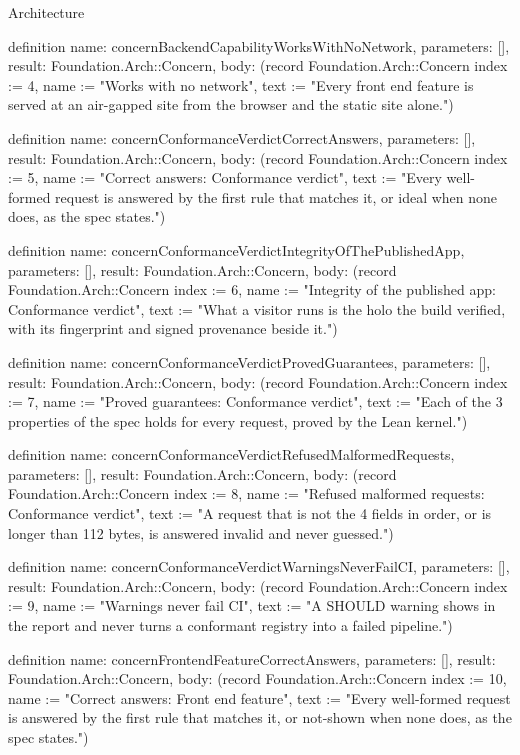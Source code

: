 \begin{lexlean}{Architecture}
\begin{semanticmodule}
definition{
  name: concernBackendCapabilityWorksWithNoNetwork,
  parameters: [],
  result: Foundation.Arch::Concern,
  body: (record Foundation.Arch::Concern {index := 4, name := "Works with no network", text := "Every front end feature is served at an air-gapped site from the browser and the static site alone."})
}

definition{
  name: concernConformanceVerdictCorrectAnswers,
  parameters: [],
  result: Foundation.Arch::Concern,
  body: (record Foundation.Arch::Concern {index := 5, name := "Correct answers: Conformance verdict", text := "Every well-formed request is answered by the first rule that matches it, or ideal when none does, as the spec states."})
}

definition{
  name: concernConformanceVerdictIntegrityOfThePublishedApp,
  parameters: [],
  result: Foundation.Arch::Concern,
  body: (record Foundation.Arch::Concern {index := 6, name := "Integrity of the published app: Conformance verdict", text := "What a visitor runs is the holo the build verified, with its fingerprint and signed provenance beside it."})
}

definition{
  name: concernConformanceVerdictProvedGuarantees,
  parameters: [],
  result: Foundation.Arch::Concern,
  body: (record Foundation.Arch::Concern {index := 7, name := "Proved guarantees: Conformance verdict", text := "Each of the 3 properties of the spec holds for every request, proved by the Lean kernel."})
}

definition{
  name: concernConformanceVerdictRefusedMalformedRequests,
  parameters: [],
  result: Foundation.Arch::Concern,
  body: (record Foundation.Arch::Concern {index := 8, name := "Refused malformed requests: Conformance verdict", text := "A request that is not the 4 fields in order, or is longer than 112 bytes, is answered invalid and never guessed."})
}

definition{
  name: concernConformanceVerdictWarningsNeverFailCI,
  parameters: [],
  result: Foundation.Arch::Concern,
  body: (record Foundation.Arch::Concern {index := 9, name := "Warnings never fail CI", text := "A SHOULD warning shows in the report and never turns a conformant registry into a failed pipeline."})
}

definition{
  name: concernFrontendFeatureCorrectAnswers,
  parameters: [],
  result: Foundation.Arch::Concern,
  body: (record Foundation.Arch::Concern {index := 10, name := "Correct answers: Front end feature", text := "Every well-formed request is answered by the first rule that matches it, or not-shown when none does, as the spec states."})
}


\end{semanticmodule}
\end{lexlean}
